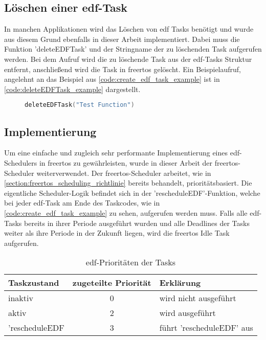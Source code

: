 \documentclass[../EDF Master Thesis.tex]{subfiles}
\begin{document}
\subsection{Löschen einer \acf{edf}-Task} \label{section:löschen_einer_edf_task}

    In manchen Applikationen wird das Löschen von \ac{edf} Tasks benötigt und wurde aus diesem Grund ebenfalls in dieser Arbeit implementiert.
    Dabei muss die Funktion 'deleteEDFTask' und der Stringname der zu löschenden Task aufgerufen werden.
    Bei dem Aufruf wird die zu löschende Task aus der \ac{edf}-Tasks Struktur entfernt, anschließend wird die Task in \ac{freertos} gelöscht.
    Ein Beispielaufruf, angelehnt an das Beispiel aus \autoref{code:create_edf_task_example} ist in \autoref{code:deleteEDFTask_example} dargestellt.

\begin{figure}[ht!]
\begin{lstlisting}[language=C, caption=deleteEDFTask Beispiel, label=code:deleteEDFTask_example]
    deleteEDFTask("Test Function")
\end{lstlisting}
\end{figure}


\subsection{Implementierung} \label{section:implementierung}
    Um eine einfache und zugleich sehr performante Implementierung eines \ac{edf}-Schedulers in \ac{freertos} zu gewährleisten, wurde in dieser Arbeit der \ac{freertos}-Scheduler weiterverwendet.
    Der \ac{freertos}-Scheduler arbeitet, wie in \autoref{section:freertos_scheduling_richtlinie} bereits behandelt, prioritätsbasiert.
    Die eigentliche Scheduler-Logik befindet sich in der 'rescheduleEDF'-Funktion, welche bei jeder \ac{edf}-Task am Ende des Taskcodes, wie in \autoref{code:create_edf_task_example} zu sehen, aufgerufen werden muss.
    Falls alle \ac{edf}-Tasks bereits in ihrer Periode ausgeführt wurden und alle Deadlines der Tasks weiter als ihre Periode in der Zukunft liegen, wird die \ac{freertos} Idle Task aufgerufen.

    \begin{table}[ht!]
        \centering
        \begin{tabular}{l|c|l}
            Taskzustand & zugeteilte Priorität & Erklärung\\
            \hline
            inaktiv & 0 & wird nicht ausgeführt\\
            aktiv & 2 & wird ausgeführt\\
            'rescheduleEDF & 3 & führt 'rescheduleEDF' aus
        \end{tabular}
        \caption{\ac{edf}-Prioritäten der Tasks}
        \label{table:edf_prioritaeten_der_tasks}
    \end{table}
\end{document}
